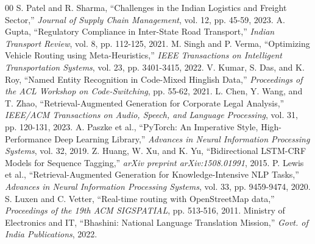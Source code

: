 \documentclass[conference]{IEEEtran}
\begin{document}
\begin{thebibliography}{00}
 S. Patel and R. Sharma, ``Challenges in the Indian Logistics and Freight Sector,'' \textit{Journal of Supply Chain Management}, vol. 12, pp. 45-59, 2023.
 A. Gupta, ``Regulatory Compliance in Inter-State Road Transport,'' \textit{Indian Transport Review}, vol. 8, pp. 112-125, 2021.
 M. Singh and P. Verma, ``Optimizing Vehicle Routing using Meta-Heuristics,'' \textit{IEEE Transactions on Intelligent Transportation Systems}, vol. 23, pp. 3401-3415, 2022.
 V. Kumar, S. Das, and K. Roy, ``Named Entity Recognition in Code-Mixed Hinglish Data,'' \textit{Proceedings of the ACL Workshop on Code-Switching}, pp. 55-62, 2021.
 L. Chen, Y. Wang, and T. Zhao, ``Retrieval-Augmented Generation for Corporate Legal Analysis,'' \textit{IEEE/ACM Transactions on Audio, Speech, and Language Processing}, vol. 31, pp. 120-131, 2023.
 A. Paszke et al., ``PyTorch: An Imperative Style, High-Performance Deep Learning Library,'' \textit{Advances in Neural Information Processing Systems}, vol. 32, 2019.
 Z. Huang, W. Xu, and K. Yu, ``Bidirectional LSTM-CRF Models for Sequence Tagging,'' \textit{arXiv preprint arXiv:1508.01991}, 2015.
 P. Lewis et al., ``Retrieval-Augmented Generation for Knowledge-Intensive NLP Tasks,'' \textit{Advances in Neural Information Processing Systems}, vol. 33, pp. 9459-9474, 2020.
 S. Luxen and C. Vetter, ``Real-time routing with OpenStreetMap data,'' \textit{Proceedings of the 19th ACM SIGSPATIAL}, pp. 513-516, 2011.
 Ministry of Electronics and IT, ``Bhashini: National Language Translation Mission,'' \textit{Govt. of India Publications}, 2022.
\end{thebibliography}
\end{document}
